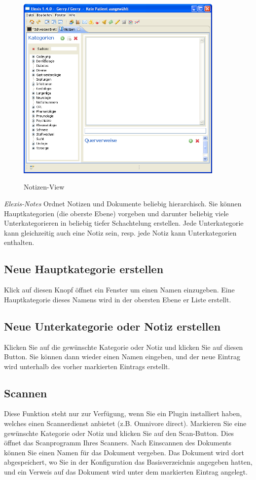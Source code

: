 \documentclass[a4paper]{scrartcl}
\begin{document}
\begin{figure}
  \includegraphics[width=0.9\textwidth]{notesview2}\\
  \caption{Notizen-View}\label{fig:notes2}
\end{figure}

\textit{Elexis-Notes} Ordnet Notizen und Dokumente beliebig hierarchisch. Sie können Hauptkategorien (die oberste Ebene) vorgeben und darunter beliebig viele Unterkategorieren in beliebig tiefer Schachtelung erstellen. Jede Unterkategorie kann gleichzeitig auch eine Notiz sein, resp. jede Notiz kann Unterkategorien enthalten.

\subsection{Neue Hauptkategorie erstellen}
Klick auf diesen Knopf öffnet ein Fenster um einen Namen einzugeben. Eine Hauptkategorie dieses Namens wird in der obersten Ebene er Liste erstellt.

\subsection{Neue Unterkategorie oder Notiz erstellen}
Klicken Sie auf die gewünschte Kategorie oder Notiz und klicken Sie auf diesen Button. Sie können dann wieder einen Namen eingeben, und der neue Eintrag wird unterhalb des vorher markierten Eintrags erstellt.

\subsection{Scannen}
Diese Funktion steht nur zur Verfügung, wenn Sie ein Plugin installiert haben, welches einen Scannerdienst anbietet (z.B. Omnivore direct). Markieren Sie eine gewünschte Kategorie oder Notiz und klicken Sie  auf den Scan-Button. Dies öffnet das Scanprogramm Ihres Scanners. Nach Einscannen des Dokuments können Sie einen Namen für das Dokument vergeben. Das Dokument wird dort abgespeichert, wo Sie in der Konfiguration das Basisverzeichnis angegeben hatten, und ein Verweis auf das Dokument wird unter dem markierten Eintrag angelegt.
\end{document}
